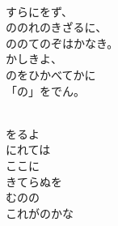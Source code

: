 \documentclass[10pt,b5j]{tarticle} %
\begin{document}
\vspace{1.5em} %
\newcommand{\linespace}{0.5em} %
\newcommand{\blocksize}{0.5\hsize} %
\newcommand{\itemmargin}{3em} %
\begin{enumerate} %
    \setlength{\itemindent}{\itemmargin} %
    \begin{minipage}[c]{\blocksize}
    
        \vspace{\linespace}
        \item~\\
        すらにをず、\\
        ののれのきざるに、\\
        ののてのぞはかなき。\\
        かしきよ、\\
        のをひかべてかに\\
        「の」をでん。
        
    \end{minipage}
    \begin{minipage}[c]{\blocksize}
        
        \vspace{\linespace}
        \item~\\
        をるよ\\
        にれては\\
        ここに\\
        きてらぬを\\
        むのの\\
        これがのかな
        
    \end{minipage}
    \begin{minipage}[c]{\blocksize}
        

\end{minipage}
\end{enumerate}
\end{document}
